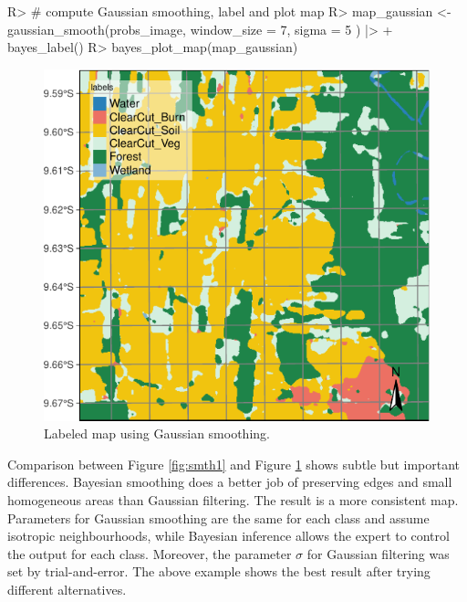 \documentclass[
  shortnames]{jss}
\begin{document}
\begin{CodeChunk}
\begin{CodeInput}
R> # compute Gaussian smoothing, label and plot map
R> map_gaussian <- gaussian_smooth(probs_image, window_size = 7, sigma = 5 ) |> 
+   bayes_label()
R> bayes_plot_map(map_gaussian)
\end{CodeInput}
\begin{figure}[h]

{\centering \includegraphics{Bayesian_smoothing_JSS_files/figure-latex/gauss-1} 

}

\caption[Labeled map using Gaussian smoothing]{Labeled map using Gaussian smoothing.}\label{fig:gauss}
\end{figure}
\end{CodeChunk}

Comparison between Figure \ref{fig:smth1} and Figure \ref{fig:gauss} shows subtle but important differences. Bayesian smoothing does a better job of preserving edges and small homogeneous areas than Gaussian filtering. The result is a more consistent map. Parameters for Gaussian smoothing are the same for each class and assume isotropic neighbourhoods, while Bayesian inference allows the expert to control the output for each class. Moreover, the parameter \(\sigma\) for Gaussian filtering was set by trial-and-error. The above example shows the best result after trying different alternatives.
\end{document}
